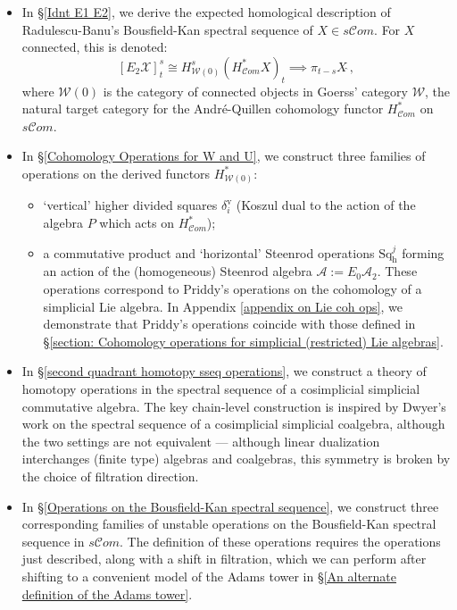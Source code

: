 \documentclass[11pt]{amsart} \renewcommand{\baselinestretch}{1.2}
\theoremstyle{plain}
\theoremstyle{definition}
\newcommand{\scrC}{\mathscr{C}}
\newcommand{\calA}{\mathcal{A}}
\newcommand{\calw}{\mathcal{W}}
\newcommand{\cala}{\mathcal{A}}
\newcommand{\calx}{\mathcal{X}}
\newcommand{\LieSteen}{\calA}
\newcommand{\algs}{{\scrC\!\textit{om}}}
\newcommand{\E}[5]{[E^{#1}_{#2}#3]^{#4}_{#5}}
\newcommand{\uver}{^\mathrm{v}}
\newcommand{\dhor}{_\mathrm{h}}
\newcommand{\Sqh}{\mathrm{Sq}\dhor}
\newcommand{\deltav}{\delta\uver}
\begin{document}
\begin{Introduction}
\begin{itemize}
\item In \S\ref{Idnt E1 E2}, we derive the expected homological description of Radulescu-Banu's Bousfield-Kan spectral sequence of $X\in s\algs$. For $X$ connected, this is denoted:
\[\E{}{2}{\calx}{s}{t}\cong H^{s}_{\calw(0)}(H^{*}_{\algs}X)_t\implies \pi_{t-s}X\hat{\ },\]
where $\calw(0)$ is the category of connected objects in Goerss' category $\calw$, the natural target category for the Andr\'e-Quillen cohomology functor $H^*_\algs$ on $s\algs$.
\item In \S\ref{Cohomology Operations for W and U}, we construct three families of operations on the derived functors $H^*_{\calw(0)}$:
\begin{itemize}
\item `vertical' higher divided squares $\deltav_i$ (Koszul dual to the action of the algebra $P$ which acts on $H^*_{\algs}$);
\item a commutative product and `horizontal' Steenrod operations $\Sqh^j$ forming an action of the (homogeneous) Steenrod algebra $\LieSteen:=E_0\cala_2$.  These operations correspond to Priddy's operations \cite{PriddySimplicialLie.pdf} on the cohomology of a simplicial Lie algebra. In Appendix \ref{appendix on Lie coh ops}, we demonstrate that Priddy's operations coincide with those defined in \S\ref{section: Cohomology operations for simplicial (restricted) Lie algebras}.
\end{itemize}
\item In \S\ref{second quadrant homotopy sseq operations}, we construct a theory of homotopy operations in the spectral sequence of a cosimplicial simplicial commutative algebra. The key chain-level construction is inspired by Dwyer's work \cite{DwyerHigherDividedSquares.pdf} on the spectral sequence of a cosimplicial simplicial coalgebra, although the two settings are not equivalent  --- although linear dualization interchanges (finite type) algebras and coalgebras, this symmetry is broken by the choice of filtration direction.
\item In \S\ref{Operations on the Bousfield-Kan spectral sequence}, we construct three corresponding families of unstable operations on the Bousfield-Kan spectral sequence in $s\algs$. The definition of these operations requires the operations just described, along with a shift in filtration, which we can perform after shifting to a convenient model of the Adams tower in \S\ref{An alternate definition of the Adams tower}.

\end{itemize}
\end{Introduction}
\end{document}
